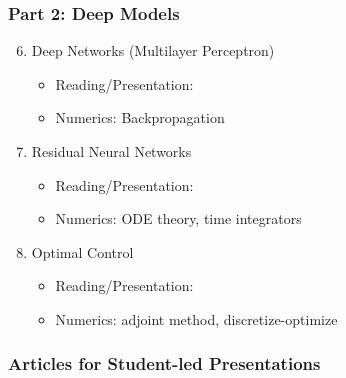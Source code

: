 \documentclass[12pt,fleqn]{beamer}
\begin{document}
\begin{frame}
\frametitle{Part 2: Deep Models}


\begin{enumerate}
	\setcounter{enumi}{5}
\item Deep Networks (Multilayer Perceptron)
\begin{itemize}
	\item Reading/Presentation: \cite{Rumelhart1986} 
	\item Numerics: Backpropagation
\end{itemize}
\item Residual Neural Networks
\begin{itemize}
	\item Reading/Presentation: \cite{he2016identity,he2016deep,E2017, ChenEtAl2018} 
	\item Numerics: ODE theory, time integrators
\end{itemize}
\item Optimal Control
\begin{itemize}
	\item Reading/Presentation: \cite{GholamiEtAl2019} 
	\item Numerics: adjoint method, discretize-optimize
\end{itemize}
\end{enumerate}
\end{frame}


\begin{frame}[allowframebreaks]
	\frametitle{Articles for Student-led Presentations}



\end{frame}

\end{document}
